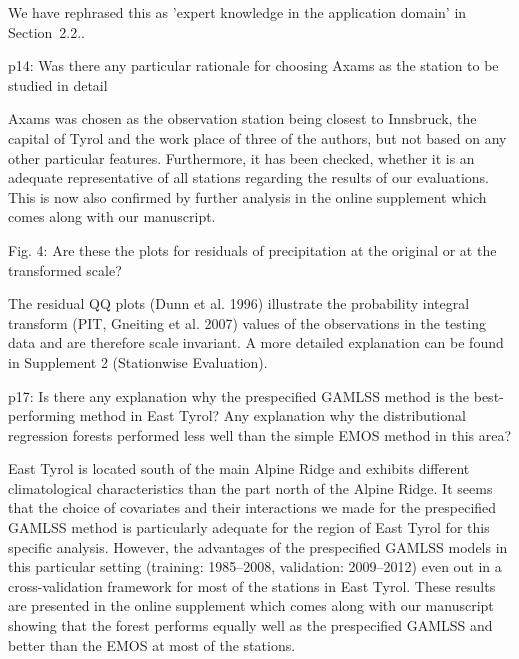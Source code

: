 \documentclass[american,foldmarks=false,noconfig]{uibklttr}
\newenvironment{review}{\fontshape{\itdefault}\fontseries{\bfdefault} \selectfont \smallskip}{\par}
\begin{document}
We have rephrased this as 'expert knowledge in the application domain'
in Section~2.2..


\begin{review}
p14: Was there any particular rationale for choosing Axams 
as the station to be studied in detail
\end{review}

Axams was chosen as the observation station being closest 
to Innsbruck, the capital of Tyrol and the work place of 
three of the authors, but not based on any other particular 
features. Furthermore, it has been checked, whether it 
is an adequate representative of all stations regarding 
the results of our evaluations. This is now also 
confirmed by further analysis in the online supplement which
comes along with our manuscript.

\begin{review}
Fig. 4: Are these the plots for residuals of precipitation 
at the original or at the transformed scale?
\end{review}

The residual QQ plots (Dunn et al. 1996) illustrate the probability 
integral transform (PIT, Gneiting et al. 2007) values of the observations 
in the testing data and are therefore scale invariant. A more detailed 
explanation can be found in Supplement 2 (Stationwise Evaluation).

\begin{review}
p17: Is there any explanation why the prespecified GAMLSS 
method is the best-performing method in East Tyrol? Any 
explanation why the distributional regression forests 
performed less well than the simple EMOS method in this area?
\end{review}

East Tyrol is located south of the main Alpine Ridge and exhibits different
climatological characteristics than the part north of the Alpine Ridge.  It
seems that the choice of covariates and their interactions we made for the
prespecified GAMLSS method is particularly adequate for the region of East
Tyrol for this specific analysis. However, the advantages of the prespecified
GAMLSS models in this particular setting (training: 1985--2008, validation:
2009--2012) even out in a cross-validation framework for most of the stations
in East Tyrol. These results are presented in the online supplement which comes
along with our manuscript showing that the forest performs equally well as the
prespecified GAMLSS and better than the EMOS at most of the stations.
\end{document}
